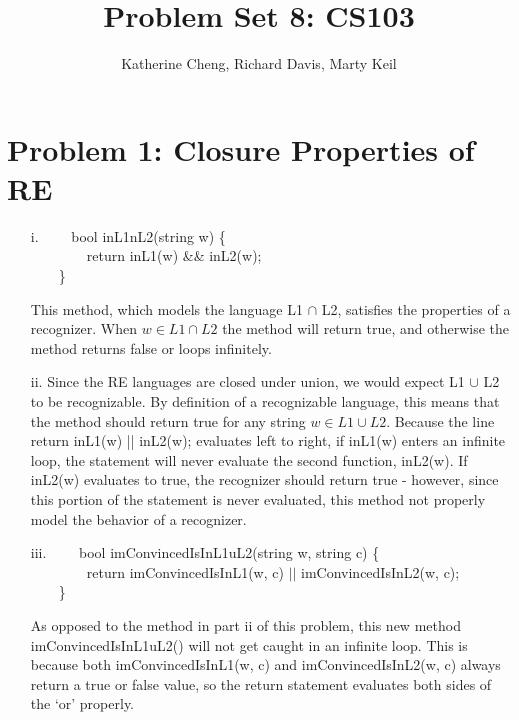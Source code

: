 \documentclass[10pt,letter]{article}
\begin{document}

\title{Problem Set 8: CS103}

\author{Katherine Cheng, Richard Davis, Marty Keil}

 
\maketitle

\section*{Problem 1: Closure Properties of RE}

\begin{enumerate}
\item[i.] 
{\selectfont
$\qquad$bool inL1nL2(string w) \{\\
$\qquad$$\qquad$return inL1(w) \&\& inL2(w);\\
$\qquad$\}
}

This method, which models the language L1 $\cap$ L2, satisfies the properties of a recognizer. When $w \in L1 \cap L2$ the method will return true, and otherwise the method returns false or loops infinitely.
\item[ii.] Since the RE languages are closed under union, we would expect L1 $\cup$ L2 to be recognizable. By definition of a recognizable language, this means that the method should return true for any string $w \in L1 \cup L2$. Because the line {\selectfont return inL1(w) || inL2(w);} evaluates left to right, if {\selectfont inL1(w)} enters an infinite loop, the statement will never evaluate the second function, {\selectfont inL2(w)}. If {\selectfont inL2(w)} evaluates to true, the recognizer should return true - however, since this portion of the statement is never evaluated, this method not properly model the behavior of a recognizer.
\item[iii.] 
{\selectfont
$\qquad$bool imConvincedIsInL1uL2(string w, string c) \{\\
$\qquad$$\qquad$return imConvincedIsInL1(w, c) $||$  imConvincedIsInL2(w, c);\\
$\qquad$\}
}

As opposed to the method in part ii of this problem, this new method {\selectfont imConvincedIsInL1uL2()} will not get caught in an infinite loop. This is because both {\selectfont imConvincedIsInL1(w, c)} and {\selectfont imConvincedIsInL2(w, c)} always return a true or false value, so the return statement evaluates both sides of the `or' properly.
\end{enumerate}
\end{document}
